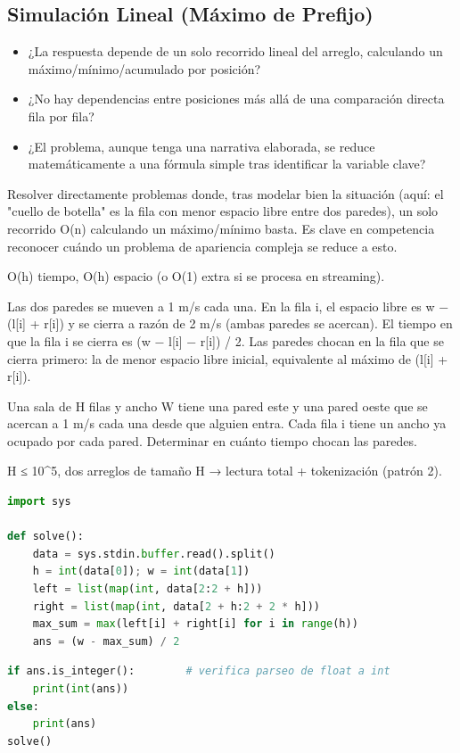 \subsection{Simulación Lineal (Máximo de Prefijo)}


\begin{itemize}
\item ¿La respuesta depende de un solo recorrido lineal del arreglo, calculando un máximo/mínimo/acumulado por posición?
\item ¿No hay dependencias entre posiciones más allá de una comparación directa fila por fila?
\item ¿El problema, aunque tenga una narrativa elaborada, se reduce matemáticamente a una fórmula simple tras identificar la variable clave?
\end{itemize}

 Resolver directamente problemas donde, tras modelar bien la situación (aquí: el "cuello de botella" es la fila con menor espacio libre entre dos paredes), un solo recorrido O(n) calculando un máximo/mínimo basta. Es clave en competencia reconocer cuándo un problema de apariencia compleja se reduce a esto.

 O(h) tiempo, O(h) espacio (o O(1) extra si se procesa en streaming).

 Las dos paredes se mueven a 1 m/s cada una. En la fila i, el espacio libre es w − (l[i] + r[i]) y se cierra a razón de 2 m/s (ambas paredes se acercan). El tiempo en que la fila i se cierra es (w − l[i] − r[i]) / 2. Las paredes chocan en la fila que se cierra primero: la de menor espacio libre inicial, equivalente al máximo de (l[i] + r[i]).


Una sala de H filas y ancho W tiene una pared este y una pared oeste que se acercan a 1 m/s cada una desde que alguien entra. Cada fila i tiene un ancho ya ocupado por cada pared. Determinar en cuánto tiempo chocan las paredes.

 H ≤ 10\textasciicircum{}5, dos arreglos de tamaño H → lectura total + tokenización (patrón 2).


\begin{lstlisting}[language=Python]
import sys
 
def solve():
    data = sys.stdin.buffer.read().split()
    h = int(data[0]); w = int(data[1])
    left = list(map(int, data[2:2 + h]))
    right = list(map(int, data[2 + h:2 + 2 * h]))
    max_sum = max(left[i] + right[i] for i in range(h))
    ans = (w - max_sum) / 2
\end{lstlisting}


\begin{lstlisting}[language=Python]
if ans.is_integer():        # verifica parseo de float a int
    print(int(ans))
else:
    print(ans)
solve()
\end{lstlisting}